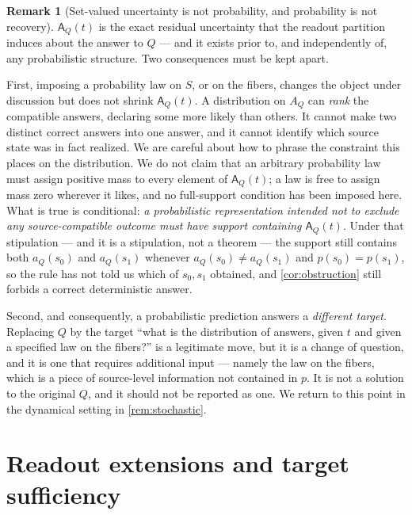 \documentclass[11pt,reqno]{amsart}
\theoremstyle{plain}
\theoremstyle{definition}
\newtheorem{remark}[theorem]{Remark}
\newcommand{\Src}{S}
\newcommand{\CompatSet}{\mathsf{A}}      %
\begin{document}
\begin{remark}[Set-valued uncertainty is not probability, and probability is not
recovery]\label{rem:not-probability}
$\CompatSet_Q(t)$ is the exact residual uncertainty that the readout partition induces about the
answer to $Q$ --- and it exists prior to, and independently of, any probabilistic structure. Two
consequences must be kept apart.

First, imposing a probability law on $\Src$, or on the fibers, changes the object under
discussion but does not shrink $\CompatSet_Q(t)$. A distribution on $A_Q$ can \emph{rank} the
compatible answers, declaring some more likely than others. It cannot make two distinct correct
answers into one answer, and it cannot identify which source state was in fact realized. We are
careful about how to phrase the constraint this places on the distribution. We do not claim that
an arbitrary probability law must assign positive mass to every element of $\CompatSet_Q(t)$; a
law is free to assign mass zero wherever it likes, and no full-support condition has been imposed
here. What is true is conditional: \emph{a probabilistic representation intended not to exclude
any source-compatible outcome must have support containing $\CompatSet_Q(t)$}. Under that
stipulation --- and it is a stipulation, not a theorem --- the support still contains both
$a_Q(s_0)$ and $a_Q(s_1)$ whenever $a_Q(s_0)\neq a_Q(s_1)$ and $p(s_0)=p(s_1)$, so the rule has
not told us which of $s_0,s_1$ obtained, and \cref{cor:obstruction} still forbids a correct
deterministic answer.

Second, and consequently, a probabilistic prediction answers a \emph{different target}. Replacing
$Q$ by the target ``what is the distribution of answers, given $t$ and given a specified law on
the fibers?'' is a legitimate move, but it is a change of question, and it is one that requires
additional input --- namely the law on the fibers, which is a piece of source-level information
not contained in $p$. It is not a solution to the original $Q$, and it should not be reported as
one. We return to this point in the dynamical setting in \cref{rem:stochastic}.
\end{remark}

\section{Readout extensions and target sufficiency}\label{sec:extensions}
\end{document}
